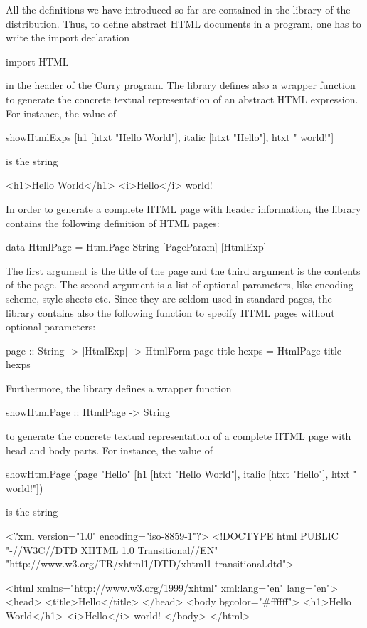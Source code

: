 All the definitions we have introduced so far are contained
in the library 
of the \pakcs{} distribution. Thus, to define abstract
HTML documents in a program, one has to write the import declaration
\begin{prog}
import HTML
\end{prog}
in the header of the Curry program.
The  library defines also a wrapper function
 to generate the concrete textual
representation of an abstract HTML expression. For instance, the value of
\begin{prog}
showHtmlExps [h1 [htxt "Hello World"], italic [htxt "Hello"], htxt " world!"]
\end{prog}
is the string
\begin{prog}
<h1>Hello World</h1>
<i>Hello</i> world!
\end{prog}
In order to generate a complete HTML page with header information,
the  library contains the following definition of HTML pages:
\begin{prog}
data HtmlPage = HtmlPage String [PageParam] [HtmlExp] 
\end{prog}
The first argument is the title of the page
and the third argument is the contents of the page.
The second argument is a list of optional parameters,
like encoding scheme, style sheets etc.
Since they are seldom used in standard pages,
the  library contains also the following function
to specify HTML pages without optional parameters:
\begin{prog}
page :: String -> [HtmlExp] -> HtmlForm
page title hexps = HtmlPage title [] hexps
\end{prog}
%
Furthermore, the  library defines a wrapper function
\begin{prog}
showHtmlPage :: HtmlPage -> String
\end{prog}
to generate the concrete textual
representation of a complete HTML page with head and body parts.
For instance, the value of
\begin{prog}
showHtmlPage (page "Hello" [h1 [htxt "Hello World"],
                            italic [htxt "Hello"], htxt " world!"])
\end{prog}
is the string
\begin{prog}
<?xml version="1.0" encoding="iso-8859-1"?>
<!DOCTYPE html PUBLIC "-//W3C//DTD XHTML 1.0 Transitional//EN"
  "http://www.w3.org/TR/xhtml1/DTD/xhtml1-transitional.dtd">

<html xmlns="http://www.w3.org/1999/xhtml" xml:lang="en" lang="en">
<head>
<title>Hello</title>
</head>
<body bgcolor="\#ffffff">
<h1>Hello World</h1>
<i>Hello</i> world!
</body>
</html>
\end{prog}

